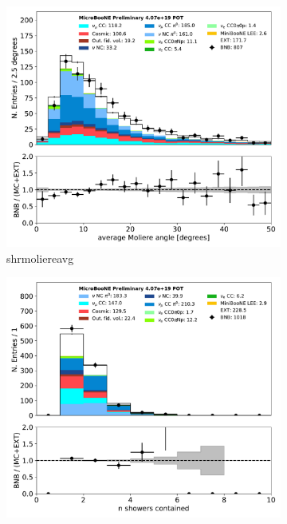 \documentclass[a4paper]{article}
\begin{document}
\begin{figure}[H] 
\begin{center}
    \begin{subfigure}[b]{0.3\textwidth}
    \centering
    \includegraphics[width=1.00\textwidth]{1eNp/dataMCRun1/shrmoliereavg01152020.pdf}
    \caption{\label{fig:1eNp:dataMCRun1:shrmoliereavg} shrmoliereavg }
    \end{subfigure}
    \begin{subfigure}[b]{0.3\textwidth}
    \centering
    \includegraphics[width=1.00\textwidth]{1eNp/dataMCRun1/n_showers_contained01152020.pdf}

\end{subfigure}
\end{center}
\end{figure}
\end{document}
